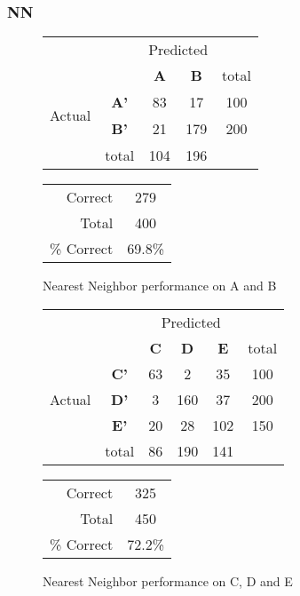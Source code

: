 \subsubsection{NN}
\begin{figure}[!ht]
\begin{minipage}[b]{0.5\linewidth}
\centering
	\begin{tabular}{ccc|c|c}
	 & &\multicolumn{2}{c}{Predicted} &\\
	  & & \bf{A} &  \bf{B} & total \\
	 \cline{3-5}
	 \multirow{2}{*}{\begin{sideways}Actual\end{sideways}} & \bf{A'}& 83 & 17 & 100 \\
	 \cline{3-5}
	 & \bf{B'}& 21 & 179 & 200 \\
	  \cline{3-5}
	 &total&104&196&\\
	\end{tabular}
\end{minipage}
\hspace{0.5cm}
\begin{minipage}[b]{0.5\linewidth}
	\begin{tabular}{r|c}
	\hline
	Correct& 279\\
	Total& 400\\
	\hline
	\% Correct& 69.8\%\\
	\hline
	\end{tabular}
\end{minipage}
\vspace{1mm}
\caption{Nearest Neighbor performance on A and B}
\end{figure}


\begin{figure}[!ht]
\begin{minipage}[b]{0.5\linewidth}
\centering
	\begin{tabular}{ccc|c|c|c}
	 & &\multicolumn{3}{c}{Predicted} &\\
	  & & \bf{C} &  \bf{D} & \bf{E} & total \\
	 \cline{3-5}
	 \multirow{3}{*}{\begin{sideways}Actual\end{sideways}} & \bf{C'}& 63 & 2 & 35 & 100\\
	 \cline{3-6}
	 & \bf{D'}& 3 & 160 & 37 & 200\\
	  \cline{3-6}
	 & \bf{E'}& 20 & 28 & 102 &  150\\
	  \cline{3-6}
	 &total&86&190&141\\
	\end{tabular}
\end{minipage}
\hspace{0.5cm}
\begin{minipage}[b]{0.5\linewidth}
	\begin{tabular}{r|c}
	\hline
	Correct& 325\\
	Total& 450 \\
	\hline
	\% Correct& 72.2\%\\
	\hline
	\end{tabular}
\end{minipage}
\vspace{1mm}
\caption{Nearest Neighbor performance on C, D and E}
\end{figure}


